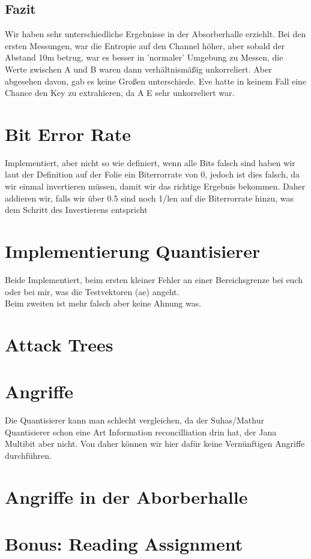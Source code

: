 \documentclass[12pt,a4paper]{article}
\begin{document}
\subsection*{Fazit}
Wir haben sehr unterschiedliche Ergebnisse in der Absorberhalle erziehlt. Bei den ersten Messungen, war die Entropie auf den Channel höher, aber sobald der Abstand 10m betrug, war es besser in 'normaler' Umgebung zu Messen, die Werte zwischen A und B waren dann verhältnismäßig unkorreliert. Aber abgesehen davon, gab es keine Großen unterschiede. Eve hatte in keinem Fall eine Chance den Key zu extrahieren, da A E sehr unkorreliert war.
\clearpage
\section{Bit Error Rate}
Implementiert, aber nicht so wie definiert, wenn alle Bits falsch sind haben wir laut der Definition auf der Folie ein Biterrorrate von 0, jedoch ist dies falsch, da wir einmal invertieren müssen, damit wir das richtige Ergebnis bekommen. Daher addieren wir, falls wir über 0.5 sind noch 1/len auf die Biterrorrate hinzu, was dem Schritt des Invertierens entspricht
\section{Implementierung Quantisierer}
Beide Implementiert, beim ersten kleiner Fehler an einer Bereichsgrenze bei euch oder bei mir, was die Testvektoren (ae) angeht.\\
Beim zweiten ist mehr falsch aber keine Ahnung was.
\section{Attack Trees}
\section{Angriffe}
Die Quantisierer kann man schlecht vergleichen, da der Suhas/Mathur Quantisierer schon eine Art Information reconcilliation drin hat, der Jana Multibit aber nicht. Von daher können wir hier dafür keine Vernünftigen Angriffe durchführen.
\section{Angriffe in der Aborberhalle}
\section{Bonus: Reading Assignment}
\end{document}
